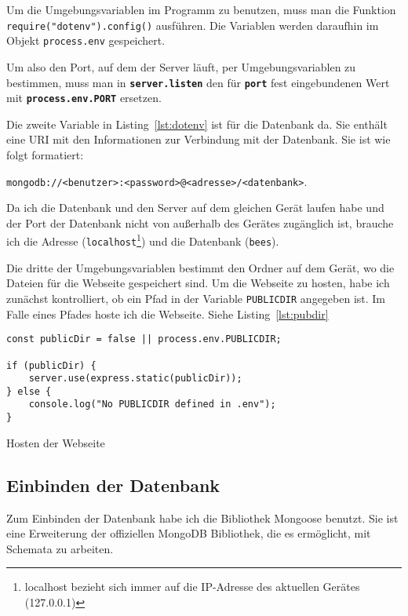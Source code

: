 \documentclass[a4paper, ngerman, 11pt]{scrartcl}
\newcommand{\js}[1]{\texttt{#1}}
\begin{document}
Um die Umgebungsvariablen im Programm zu benutzen, muss man die Funktion \js{require("dotenv").config()} ausführen.
Die Variablen werden daraufhin im Objekt \js{process.env} gespeichert.

Um also den Port, auf dem der Server läuft, per Umgebungsvariablen zu bestimmen, muss man in \textbf{\js{server.listen}} den für \textbf{\texttt{port}} fest eingebundenen Wert mit \textbf{\js{process.env.PORT}} ersetzen.

Die zweite Variable in Listing~\ref{lst:dotenv} ist für die Datenbank da.
Sie enthält eine URI mit den Informationen zur Verbindung mit der Datenbank.
Sie ist wie folgt formatiert:

\texttt{mongodb://<benutzer>:<password>@<adresse>/<datenbank>}.

Da ich die Datenbank und den Server auf dem gleichen Gerät laufen habe und der Port der Datenbank nicht von außerhalb des Gerätes zugänglich ist, brauche ich die Adresse (\texttt{localhost}\footnote{localhost bezieht sich immer auf die IP-Adresse des aktuellen Gerätes (127.0.0.1) }) und die Datenbank (\texttt{bees}).

Die dritte der Umgebungsvariablen bestimmt den Ordner auf dem Gerät, wo die Dateien für die Webseite gespeichert sind.
Um die Webseite zu hosten, habe ich zunächst kontrolliert, ob ein Pfad in der Variable \texttt{PUBLICDIR} angegeben ist. Im Falle eines Pfades hoste ich die Webseite. Siehe Listing~\ref{lst:pubdir}
\begin{listing}[ht]
\centering
\begin{verbatim}
const publicDir = false || process.env.PUBLICDIR;

if (publicDir) {
    server.use(express.static(publicDir));
} else {
    console.log("No PUBLICDIR defined in .env");
}
\end{verbatim}
\caption{Hosten der Webseite\label{lst:pubdir}}
\end{listing}


\subsection[Einbinden der Datenbank]{Einbinden der Datenbank} %

Zum Einbinden der Datenbank habe ich die Bibliothek Mongoose benutzt. Sie ist eine Erweiterung der offiziellen MongoDB Bibliothek, die es ermöglicht, mit Schemata zu arbeiten.
\end{document}
